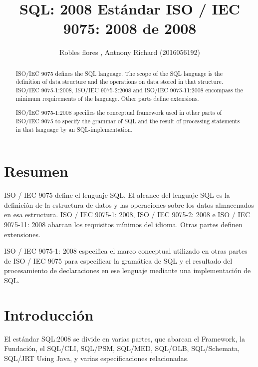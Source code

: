 \documentclass[preprint,12pt]{elsarticle}
\begin{document}
	
	\begin{frontmatter}

		\title{\huge SQL: 2008  Estándar ISO / IEC 9075: 2008 de 2008}
		
		\author{Robles flores , Antnony Richard              (2016056192)}
		
		\address{Tacna, Perú}
		
		\begin{abstract}
ISO/IEC 9075 defines the SQL language. The scope of the SQL language is the definition of data structure and the operations on data stored in that structure. ISO/IEC 9075-1:2008, ISO/IEC 9075-2:2008 and ISO/IEC 9075-11:2008 encompass the minimum requirements of the language. Other parts define extensions.

ISO/IEC 9075-1:2008 specifies the conceptual framework used in other parts of ISO/IEC 9075 to specify the grammar of SQL and the result of processing statements in that language by an SQL-implementation.
		\end{abstract}
\end{frontmatter}
	
	\section{Resumen}

ISO / IEC 9075 define el lenguaje SQL. El alcance del lenguaje SQL es la definición de la estructura de datos y las operaciones sobre los datos almacenados en esa estructura. ISO / IEC 9075-1: 2008, ISO / IEC 9075-2: 2008 e ISO / IEC 9075-11: 2008 abarcan los requisitos mínimos del idioma. Otras partes definen extensiones.

ISO / IEC 9075-1: 2008 especifica el marco conceptual utilizado en otras partes de ISO / IEC 9075 para especificar la gramática de SQL y el resultado del procesamiento de declaraciones en ese lenguaje mediante una implementación de SQL.


\section{Introducción}
El estándar SQL:2008 se divide en varias partes, que abarcan el Framework, la Fundación, el SQL/CLI, SQL/PSM, SQL/MED, SQL/OLB, SQL/Schemata, SQL/JRT Using Java, y varias especificaciones relacionadas.
\end{document}
